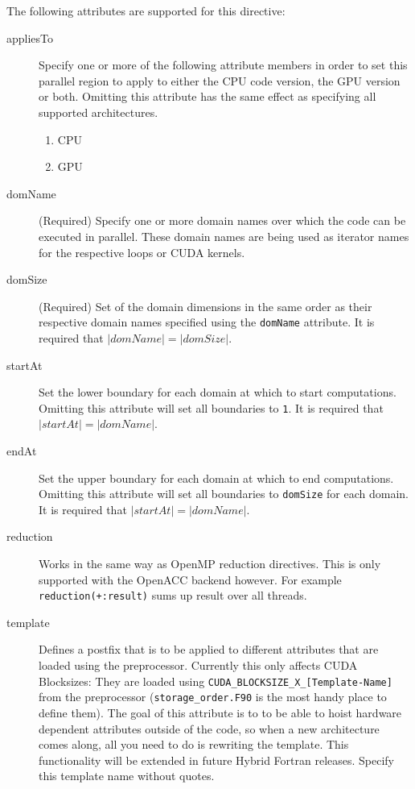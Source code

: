 The following attributes are supported for this directive:

\begin{description}
 \item [appliesTo] Specify one or more of the following attribute members in order to set this parallel region to apply to either the CPU code version, the GPU version or both. Omitting this attribute has the same effect as specifying all supported architectures.
  \begin{enumerate}
   \item CPU
   \item GPU
  \end{enumerate}
 \item [domName] (Required) Specify one or more domain names over which the code can be executed in parallel. These domain names are being used as iterator names for the respective loops or CUDA kernels.
 \item [domSize] (Required) Set of the domain dimensions in the same order as their respective domain names specified using the \verb|domName| attribute. It is required that $|domName| = |domSize|$.
 \item [startAt] Set the lower boundary for each domain at which to start computations. Omitting this attribute will set all boundaries to \verb|1|. It is required that $|startAt| = |domName|$.
 \item [endAt] Set the upper boundary for each domain at which to end computations. Omitting this attribute will set all boundaries to \verb|domSize| for each domain. It is required that $|startAt| = |domName|$.
 \item [reduction] Works in the same way as OpenMP reduction directives. This is only supported with the OpenACC backend however. For example \verb|reduction(+:result)| sums up result over all threads.
 \item [template] Defines a postfix that is to be applied to different attributes that are loaded using the preprocessor. Currently this only affects CUDA Blocksizes: They are loaded using \verb|CUDA_BLOCKSIZE_X_[Template-Name]| from the preprocessor (\verb|storage_order.F90| is the most handy place to define them). The goal of this attribute is to to be able to hoist hardware dependent attributes outside of the code, so when a new architecture comes along, all you need to do is rewriting the template. This functionality will be extended in future Hybrid Fortran releases. Specify this template name without quotes.
\end{description}

